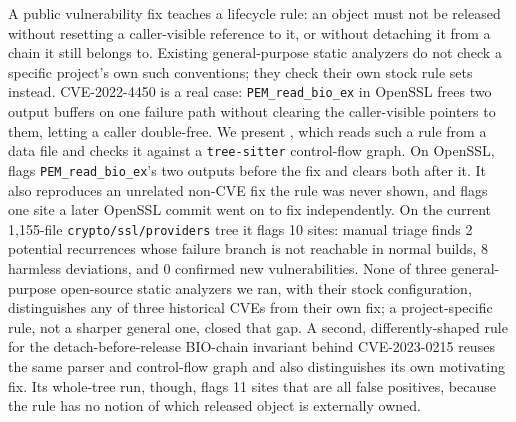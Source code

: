A public vulnerability fix teaches a lifecycle rule: an object must not
be released without resetting a caller-visible reference to it, or
without detaching it from a chain it still belongs to. Existing
general-purpose static analyzers do not check a specific project's own
such conventions; they check their own stock rule sets instead.
CVE-2022-4450 is a real case: \texttt{PEM\_read\_bio\_ex} in OpenSSL frees
two output buffers on one failure path without clearing the
caller-visible pointers to them, letting a caller double-free. We present
\tool, which reads such a rule from a data file and checks it against a
\texttt{tree-sitter} control-flow graph. On OpenSSL, \tool flags \texttt{PEM\_read\_bio\_ex}'s two outputs
before the fix and clears both after it. It also reproduces an unrelated
non-CVE fix the rule was never shown, and flags one site a later OpenSSL
commit went on to fix independently.
On the current 1{,}155-file \texttt{crypto/ssl/providers} tree it flags
10 sites: manual triage finds 2 potential recurrences whose failure
branch is not reachable in normal builds, 8 harmless deviations, and 0
confirmed new vulnerabilities. None of three
general-purpose open-source static analyzers we ran, with their stock
configuration, distinguishes any of three historical CVEs from their own
fix; a project-specific rule, not a sharper general one, closed that gap.
A second, differently-shaped rule for the detach-before-release BIO-chain
invariant behind CVE-2023-0215 reuses the same parser and control-flow
graph and also distinguishes its own motivating fix. Its whole-tree run,
though, flags 11 sites that are all false positives, because the rule has
no notion of which released object is externally owned. 
